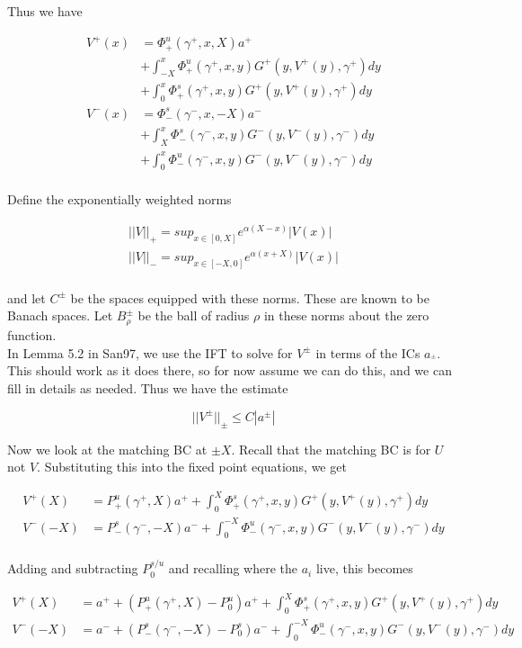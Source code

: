 \documentclass[12pt]{article}
\begin{document}
Thus we have

\begin{align*}
V^+(x) &= \Phi^u_+(\gamma^+, x, X) a^+  \\
&+ \int_{-X}^x \Phi_+^u(\gamma^+, x, y) G^+(y, V^+(y),\gamma^+)dy \\
&+ \int_0^x \Phi_+^s(\gamma^+, x, y) G^+(y, V^+(y),\gamma^+)dy \\ 
V^-(x) &= \Phi^s_-(\gamma^-, x, -X) a^-  \\
&+ \int_X^x \Phi_-^s(\gamma^-, x, y) G^-(y, V^-(y),\gamma^-)dy \\
&+ \int_0^x \Phi_-^u(\gamma^-, x, y) G^-(y, V^-(y),\gamma^-)dy \\
\end{align*}

Define the exponentially weighted norms

\begin{align*}
||V||_+ = sup_{x \in [0, X]} e^{\alpha(X - x)}|V(x)| \\
||V||_- = sup_{x \in [-X, 0]} e^{\alpha(x + X)}|V(x)| \\
\end{align*}

and let $C^\pm$ be the spaces equipped with these norms. These are known to be Banach spaces. Let $B_\rho^\pm$ be the ball of radius $\rho$ in these norms about the zero function.\\

In Lemma 5.2 in San97, we use the IFT to solve for $V^\pm$ in terms of the ICs $a_^\pm$. This should work as it does there, so for now assume we can do this, and we can fill in details as needed. Thus we have the estimate

\[
||V^\pm||_\pm \leq C |a^\pm|
\]

Now we look at the matching BC at $\pm X$. Recall that the matching BC is for $U$ not $V$. Substituting this into the fixed point equations, we get

\begin{align*}
V^+(X) &= P^u_+(\gamma^+, X) a^+ + \int_0^X \Phi_+^s(\gamma^+, x, y) G^+(y, V^+(y),\gamma^+)dy \\ 
V^-(-X) &= P^s_-(\gamma^-, -X) a^- + \int_0^{-X} \Phi_-^u(\gamma^-, x, y) G^-(y, V^-(y),\gamma^-)dy \\
\end{align*}

Adding and subtracting $P_0^{s/u}$ and recalling where the $a_i$ live, this becomes

\begin{align*}
V^+(X) &= a^+ + (P^u_+(\gamma^+, X) - P^u_0) a^+ + \int_0^X \Phi_+^s(\gamma^+, x, y) G^+(y, V^+(y),\gamma^+)dy \\ 
V^-(-X) &= a^- + (P^s_-(\gamma^-, -X) - P^s_0) a^- + \int_0^{-X} \Phi_-^u(\gamma^-, x, y) G^-(y, V^-(y),\gamma^-)dy \\
\end{align*}
\end{document}
